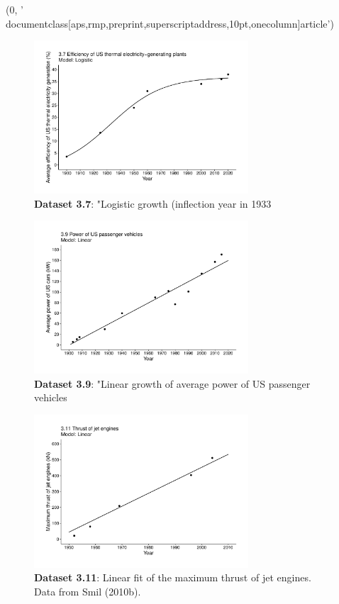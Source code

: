 (0, '\\documentclass[aps,rmp,preprint,superscriptaddress,10pt,onecolumn]{article}\n')
\begin{document}
\begin{figure}[h]
\includegraphics[width=8cm]{output/figs-ggplot/3.7.pdf}
\caption{\textbf{Dataset 3.7}: "Logistic growth (inflection year in 1933}
\end{figure}
	
\begin{figure}[h]
\includegraphics[width=8cm]{output/figs-ggplot/3.9.pdf}
\caption{\textbf{Dataset 3.9}: "Linear growth of average power of US passenger vehicles}
\end{figure}
	
\begin{figure}[h]
\includegraphics[width=8cm]{output/figs-ggplot/3.11.pdf}
\caption{\textbf{Dataset 3.11}: Linear fit of the maximum thrust of jet engines. Data from Smil (2010b).}
\end{figure}
	
\end{document}
